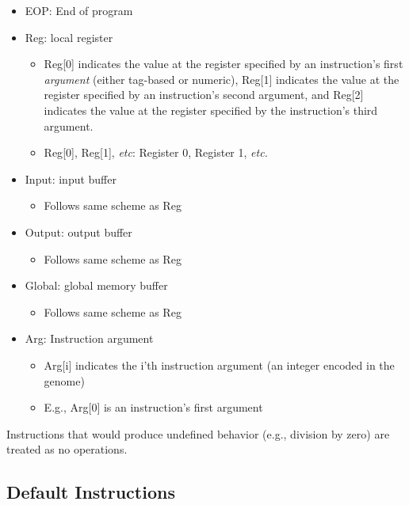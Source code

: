 \documentclass[
]{book}
\providecommand{\tightlist}{%
  \setlength{\itemsep}{0pt}\setlength{\parskip}{0pt}}
\begin{document}
\begin{itemize}
\tightlist
\item
  EOP: End of program
\item
  Reg: local register

  \begin{itemize}
  \tightlist
  \item
    Reg{[}0{]} indicates the value at the register specified by an instruction's first \emph{argument} (either tag-based or numeric), Reg{[}1{]} indicates the value at the register specified by an instruction's second argument, and Reg{[}2{]} indicates the value at the register specified by the instruction's third argument.
  \item
    Reg{[}0{]}, Reg{[}1{]}, \emph{etc}: Register 0, Register 1, \emph{etc.}
  \end{itemize}
\item
  Input: input buffer

  \begin{itemize}
  \tightlist
  \item
    Follows same scheme as Reg
  \end{itemize}
\item
  Output: output buffer

  \begin{itemize}
  \tightlist
  \item
    Follows same scheme as Reg
  \end{itemize}
\item
  Global: global memory buffer

  \begin{itemize}
  \tightlist
  \item
    Follows same scheme as Reg
  \end{itemize}
\item
  Arg: Instruction argument

  \begin{itemize}
  \tightlist
  \item
    Arg{[}i{]} indicates the i'th instruction argument (an integer encoded in the genome)
  \item
    E.g., Arg{[}0{]} is an instruction's first argument
  \end{itemize}
\end{itemize}

Instructions that would produce undefined behavior (e.g., division by zero) are treated as no operations.

\hypertarget{default-instructions}{%
\subsection{Default Instructions}\label{default-instructions}}
\end{document}
